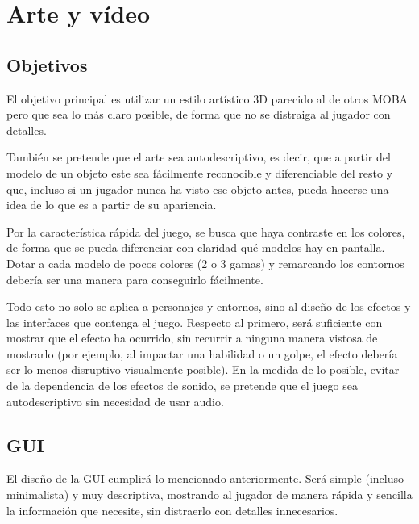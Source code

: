 \chapter{Arte y vídeo}


\section{Objetivos}

El objetivo principal es utilizar un estilo artístico 3D parecido al de otros MOBA pero que sea lo más claro posible, de forma que no se distraiga al jugador con detalles.

También se pretende que el arte sea autodescriptivo, es decir, que a partir del modelo de un objeto este sea fácilmente reconocible y diferenciable del resto y que, incluso si un jugador nunca ha visto ese objeto antes, pueda hacerse una idea de lo que es a partir de su apariencia.

\vspace{\baselineskip}

Por la característica rápida del juego, se busca que haya contraste en los colores, de forma que se pueda diferenciar con claridad qué modelos hay en pantalla. Dotar a cada modelo de pocos colores (2 o 3 gamas) y remarcando los contornos debería ser una manera para conseguirlo fácilmente.

\vspace{\baselineskip}

Todo esto no solo se aplica a personajes y entornos, sino al diseño de los efectos y las interfaces que contenga el juego. Respecto al primero, será suficiente con mostrar que el efecto ha ocurrido, sin recurrir a ninguna manera vistosa de mostrarlo (por ejemplo, al impactar una habilidad o un golpe, el efecto debería ser lo menos disruptivo visualmente posible). En la medida de lo posible, evitar de la dependencia de los efectos de sonido, se pretende que el juego sea autodescriptivo sin necesidad de usar audio.

\section{GUI}
El diseño de la GUI cumplirá lo mencionado anteriormente. Será simple (incluso minimalista) y muy descriptiva, mostrando al jugador de manera rápida y sencilla la información que necesite, sin distraerlo con detalles innecesarios.
	
